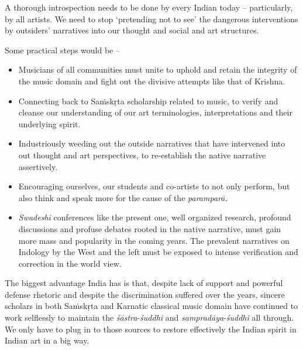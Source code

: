 A thorough introspection needs to be done by every Indian today – particularly, by all artists. We need to stop ‘pretending not to see’ the dangerous interventions by outsiders’ narratives into our thought and social and art structures.

Some practical steps would be –

\vspace{-.3cm}

\begin{itemize}
\itemsep=0pt

 \item Musicians of all communities must unite to uphold and retain the integrity of the music domain and fight out the divisive attempts like that of Krishna.

 \item Connecting back to Saṁskṛta scholarship related to music, to verify and cleanse our understanding of our art terminologies, interpretations and their underlying spirit.

 \item Industriously weeding out the outside narratives that have intervened into out thought and art perspectives, to re-establish the native narrative assertively.

 \item Encouraging ourselves, our students and co-artists to not only perform, but also think and speak more for the cause of the \textit{paramparā.}

 \item \textit{Swadeshi} conferences like the present one, well organized research, profound discussions and profuse debates rooted in the native narrative, must gain more mass and popularity in the coming years. The prevalent narratives on Indology by the West and the left must be exposed to intense verification and correction in the world view.

\end{itemize}

\vspace{-.2cm}

The biggest advantage India has is that, despite lack of support and powerful defense rhetoric and despite the discrimination suffered over the years, sincere scholars in both Saṁskṛta and Karnatic classical music domain have continued to work selflessly to maintain the \textit{śāstra}-\textit{śuddhi} and \textit{sampradāya}-\textit{śuddhi} all through. We only have to plug in to those sources to restore effectively the Indian spirit in Indian art in a big way.


